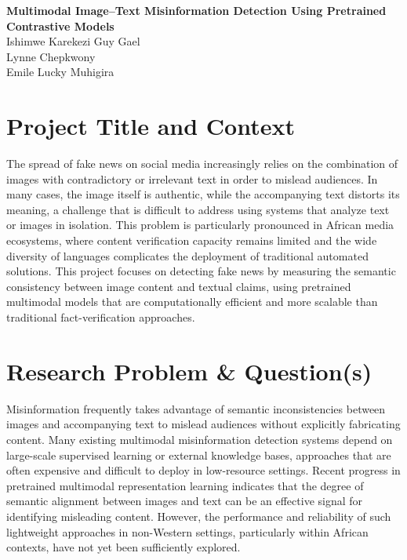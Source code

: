 \documentclass[a4paper,10.5pt,twoside]{article}
\begin{document}

\begin{center}
{\Large \textbf{Multimodal Image--Text Misinformation Detection Using Pretrained Contrastive Models}}\\[12pt]
{\normalsize
Ishimwe Karekezi Guy Gael\\
Lynne Chepkwony\\
Emile Lucky Muhigira
}
\end{center}

\section{Project Title and Context}

The spread of fake news on social media increasingly relies on the combination of images with contradictory or irrelevant text in order to mislead audiences. In many cases, the image itself is authentic, while the accompanying text distorts its meaning, a challenge that is difficult to address using systems that analyze text or images in isolation. This problem is particularly pronounced in African media ecosystems, where content verification capacity remains limited and the wide diversity of languages complicates the deployment of traditional automated solutions. This project focuses on detecting fake news by measuring the semantic consistency between image content and textual claims, using pretrained multimodal models that are computationally efficient and more scalable than traditional fact-verification approaches.

\section{Research Problem \& Question(s)}

Misinformation frequently takes advantage of semantic inconsistencies between images and accompanying text to mislead audiences without explicitly fabricating content. Many existing multimodal misinformation detection systems depend on large-scale supervised learning or external knowledge bases, approaches that are often expensive and difficult to deploy in low-resource settings. Recent progress in pretrained multimodal representation learning indicates that the degree of semantic alignment between images and text can be an effective signal for identifying misleading content. However, the performance and reliability of such lightweight approaches in non-Western settings, particularly within African contexts, have not yet been sufficiently explored.
\end{document}
